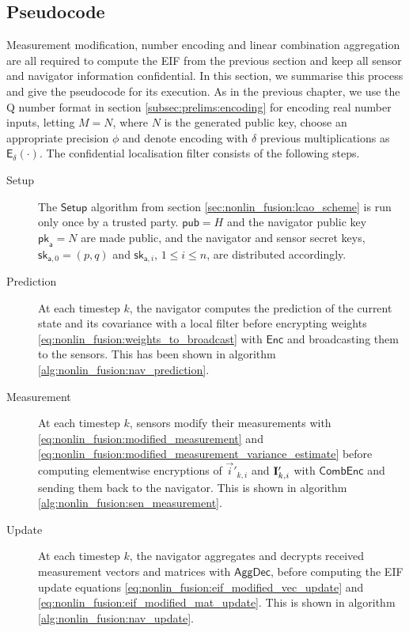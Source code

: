 \subsection{Pseudocode}\label{subsec:nonlin_fusion:pseudocode}
Measurement modification, number encoding and linear combination aggregation are all required to compute the EIF from the previous section and keep all sensor and navigator information confidential. In this section, we summarise this process and give the pseudocode for its execution. As in the previous chapter, we use the  Q number format in section \ref{subsec:prelims:encoding} for encoding real number inputs, letting $M=N$, where $N$ is the generated public key, choose an appropriate precision $\phi$ and denote encoding with $\delta$ previous multiplications as $\mathsf{E}_{\delta}(\cdot)$. The confidential localisation filter consists of the following steps.
\begin{description}
    \item[Setup] The $\mathsf{Setup}$ algorithm from section \ref{sec:nonlin_fusion:lcao_scheme} is run only once by a trusted party. $\mathsf{pub}=H$ and the navigator public key $\mathsf{pk}_{\mathsf{a}}=N$ are made public, and the navigator and sensor secret keys, $\mathsf{sk}_{\mathsf{a},0}=(p, q)$ and $\mathsf{sk}_{\mathsf{a}, i}$, $1\leq i\leq n$, are distributed accordingly.

    \item[Prediction] At each timestep $k$, the navigator computes the prediction of the current state and its covariance with a local filter before encrypting weights \eqref{eq:nonlin_fusion:weights_to_broadcast} with $\mathsf{Enc}$ and broadcasting them to the sensors. This has been shown in algorithm \ref{alg:nonlin_fusion:nav_prediction}.

    \item[Measurement] At each timestep $k$, sensors modify their measurements with \eqref{eq:nonlin_fusion:modified_measurement} and \eqref{eq:nonlin_fusion:modified_measurement_variance_estimate} before computing elementwise encryptions of $\vec{i}'_{k, i}$ and ${{\mathbf{I}}}'_{k, i}$ with $\mathsf{CombEnc}$ and sending them back to the navigator. This is shown in algorithm \ref{alg:nonlin_fusion:sen_measurement}.

    \item[Update] At each timestep $k$, the navigator aggregates and decrypts received measurement vectors and matrices with $\mathsf{AggDec}$, before computing the EIF update equations \eqref{eq:nonlin_fusion:eif_modified_vec_update} and \eqref{eq:nonlin_fusion:eif_modified_mat_update}. This is shown in algorithm \ref{alg:nonlin_fusion:nav_update}.
\end{description}

